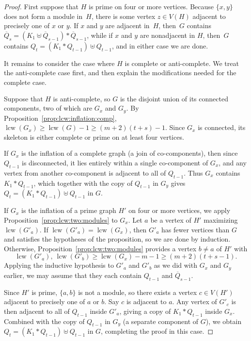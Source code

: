 \documentclass[10pt]{article}
\newcommand{\lcw}{\operatorname{lcw}}
\theoremstyle{plain}
\begin{document}
\begin{proof}
%
%
%

First suppose that $H$ is prime on four or more vertices. Because $\{x,y\}$ does not form a module in~$H$, there is some vertex $z\in V(H)$ adjacent to precisely one of $x$ or $y$. If $x$ and $y$ are adjacent in~$H$, then~$G$ contains $\overline{Q}_s=(K_1\uplus \overline{Q}_{s-1})\ast\overline{Q}_{s-1}$, while if $x$ and $y$ are nonadjacent in $H$, then~$G$ contains $Q_t=(K_1\ast Q_{t-1})\uplus Q_{t-1}$, and in either case we are done.

%
%
%

It remains to consider the case where $H$ is complete or anti-complete. We treat the anti-complete case first, and then explain the modifications needed for the complete case.

Suppose that $H$ is anti-complete, so $G$ is the disjoint union of its connected components, two of which are $G_x$ and $G_y$. By Proposition~\ref{prop:lcw:inflation:comp}, $\lcw(G_x)\ge\lcw(G)-1\ge (m+2)(t+s)-1$. Since $G_x$ is connected, its skeleton is either complete or prime on at least four vertices.

If $G_x$ is the inflation of a complete graph (a join of co-components), then since $Q_{t-1}$ is disconnected, it lies entirely within a single co-component of $G_x$, and any vertex from another co-component is adjacent to all of $Q_{t-1}$. Thus $G_x$ contains $K_1\ast Q_{t-1}$, which together with the copy of $Q_{t-1}$ in $G_y$ gives $Q_t=(K_1\ast Q_{t-1})\uplus Q_{t-1}$ in $G$.

%
%

If $G_x$ is the inflation of a prime graph $H'$ on four or more vertices, we apply Proposition~\ref{prop:lcw:two:modules} to $G_x$. Let $a$ be a vertex of $H'$ maximizing $\lcw(G'_a)$. If $\lcw(G'_a)=\lcw(G_x)$, then $G'_a$ has fewer vertices than $G$ and satisfies the hypotheses of the proposition, so we are done by induction. Otherwise, Proposition~\ref{prop:lcw:two:modules} provides a vertex $b\neq a$ of $H'$ with
\[
	\lcw(G'_a),\ \lcw(G'_b)
	\ge
	\lcw(G_x)-m-1
	\ge
	(m+2)(t+s-1).
\]
Applying the inductive hypothesis to $G'_a$ and $G'_b$ as we did with $G_x$ and $G_y$ earlier, we may assume that they each contain $Q_{t-1}$ and $\overline{Q}_{s-1}$.

Since $H'$ is prime, $\{a,b\}$ is not a module, so there exists a vertex $c\in V(H')$ adjacent to precisely one of $a$ or $b$. Say $c$ is adjacent to $a$. Any vertex of $G'_c$ is then adjacent to all of $Q_{t-1}$ inside $G'_a$, giving a copy of $K_1\ast Q_{t-1}$ inside $G_x$. Combined with the copy of $Q_{t-1}$ in $G_y$ (a separate component of $G$), we obtain $Q_t=(K_1\ast Q_{t-1})\uplus Q_{t-1}$ in $G$, completing the proof in this case.


\end{proof}
\end{document}

